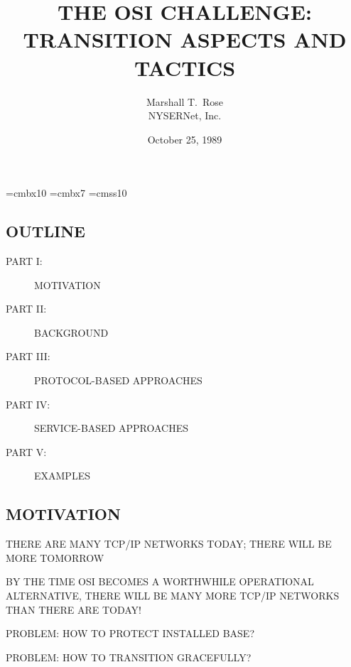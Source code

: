 

\def\emph#1{\underline{#1}}

\font\xx=cmbx10
\font\yy=cmbx7
\font\sf=cmss10

\raggedright


\let\tradeNAMfont=\relax
\let\tradeORGfont=\relax



\title	{THE OSI CHALLENGE:\\ TRANSITION ASPECTS AND TACTICS}
\author	{Marshall T.~Rose\\ NYSERNet, Inc.}
\date	{October 25, 1989}
\maketitlepage


\begin{bwslide}
\part*	{OUTLINE}\bf

\begin{description}
\item[PART I:]		MOTIVATION

\item[PART II:]		BACKGROUND

\item[PART III:]	PROTOCOL-BASED APPROACHES

\item[PART IV:]		SERVICE-BASED APPROACHES

\item[PART V:]		EXAMPLES
\end{description}
\end{bwslide}


\begin{bwslide}
\part	{MOTIVATION}\bf

\begin{nrtc}
\item	THERE ARE MANY TCP/IP NETWORKS TODAY; THERE WILL BE MORE TOMORROW

\item	BY THE TIME OSI BECOMES A WORTHWHILE OPERATIONAL ALTERNATIVE,
	THERE WILL BE MANY MORE TCP/IP NETWORKS THAN THERE ARE TODAY!

\item	PROBLEM: HOW TO PROTECT INSTALLED BASE?

\item	PROBLEM: HOW TO TRANSITION GRACEFULLY?
\end{nrtc}
\end{bwslide}


